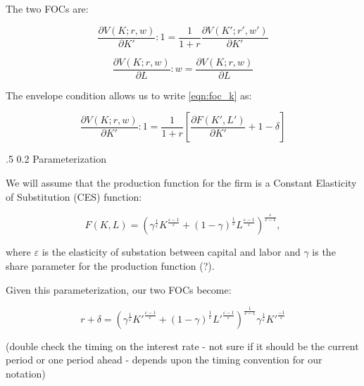 \documentclass[a4paper]{article}
\makeatletter
\renewcommand{\section}{\@startsection{section}{12}
{0mm} %
{.5\baselineskip} %
{0.2\baselineskip} %
{\large \scshape{\vspace{0.3\baselineskip}}}}
\makeatother
\begin{document}
The two FOCs are:

\begin{equation}
\label{eqn:foc_k}
\frac{\partial V(K; r, w)}{\partial K'} : 1= \frac{1}{1+r}\frac{\partial V(K';r',w')}{\partial K'}
\end{equation}

\begin{equation}
\label{eqn:foc_l}
\frac{\partial V(K; r, w)}{\partial L} : w= \frac{\partial V(K;r,w)}{\partial L}
\end{equation}

\noindent\noindent The envelope condition allows us to write \ref{eqn:foc_k} as:

\begin{equation}
\label{eqn:foc_k}
\frac{\partial V(K; r, w)}{\partial K'} : 1= \frac{1}{1+r}\left[ \frac{\partial F(K',L')}{\partial K'} + 1 -\delta \right]
\end{equation}

\section{Parameterization}

We will assume that the production function for the firm is a Constant Elasticity of Substitution (CES) function:

\begin{equation}
\label{eqn:prod_func}
F(K,L) = \left(\gamma^{\frac{1}{\varepsilon}}K^{\frac{\varepsilon-1}{\varepsilon}} + (1-\gamma)^{\frac{1}{\varepsilon}}L^{\frac{\varepsilon-1}{\varepsilon}}\right)^{\frac{\varepsilon}{\varepsilon-1}},
\end{equation}

\noindent\noindent where $\varepsilon$ is the elasticity of substation between capital and labor and $\gamma$ is the share parameter for the production function (?).  

Given this parameterization, our two FOCs become:

\begin{equation}
\label{eqn:foc_k}
 r+\delta =\left(\gamma^{\frac{1}{\varepsilon}}K'^{\frac{\varepsilon-1}{\varepsilon}} + (1-\gamma)^{\frac{1}{\varepsilon}}L'^{\frac{\varepsilon-1}{\varepsilon}}\right)^{\frac{1}{\varepsilon-1}}\gamma^{\frac{1}{\varepsilon}}K'^{\frac{-1}{\varepsilon}}
\end{equation}

(double check the timing on the interest rate - not sure if it should be the current period or one period ahead - depends upon the timing convention for our notation)
\end{document}
